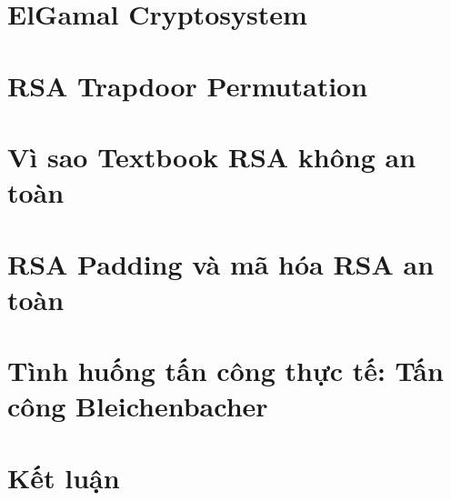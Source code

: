 \documentclass[12pt,a4paper]{article}
\begin{document}
\section{ElGamal Cryptosystem}


\section{RSA Trapdoor Permutation}


\section{Vì sao Textbook RSA không an toàn}


\section{RSA Padding và mã hóa RSA an toàn}


\section{Tình huống tấn công thực tế: Tấn công Bleichenbacher}


\section{Kết luận}

\end{document}
